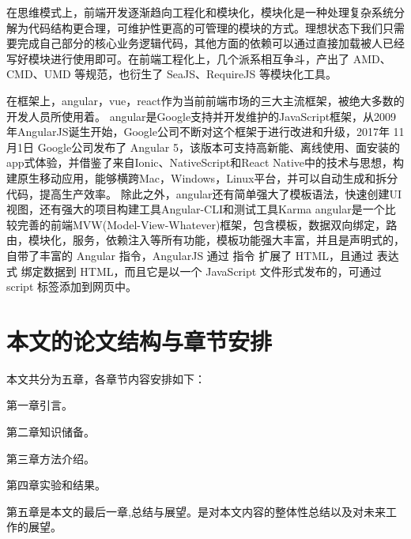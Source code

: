 在思维模式上，前端开发逐渐趋向工程化和模块化，模块化是一种处理复杂系统分解为代码结构更合理，可维护性更高的可管理的模块的方式。理想状态下我们只需要完成自己部分的核心业务逻辑代码，其他方面的依赖可以通过直接加载被人已经写好模块进行使用即可。在前端工程化上，几个派系相互争斗，产出了 AMD、CMD、UMD 等规范，也衍生了 SeaJS、RequireJS 等模块化工具。

在框架上，angular，vue，react作为当前前端市场的三大主流框架，被绝大多数的开发人员所使用着。
angular是Google支持并开发维护的JavaScript框架，从2009年AngularJS诞生开始，Google公司不断对这个框架于进行改进和升级，2017年 11月1日 Google公司发布了 Angular 5，该版本可支持高新能、离线使用、面安装的app式体验，并借鉴了来自Ionic、NativeScript和React Native中的技术与思想，构建原生移动应用，能够横跨Mac，Windows，Linux平台，并可以自动生成和拆分代码，提高生产效率。
除此之外，angular还有简单强大了模板语法，快速创建UI视图，还有强大的项目构建工具Angular-CLI和测试工具Karma
angular是一个比较完善的前端MVW(Model-View-Whatever)框架，包含模板，数据双向绑定，路由，模块化，服务，依赖注入等所有功能，模板功能强大丰富，并且是声明式的，自带了丰富的 Angular 指令，AngularJS 通过 指令 扩展了 HTML，且通过 表达式 绑定数据到 HTML，而且它是以一个 JavaScript 文件形式发布的，可通过 script 标签添加到网页中。

\section{本文的论文结构与章节安排}
\label{sec:arrangement}
本文共分为五章，各章节内容安排如下：

第一章引言。

第二章知识储备。

第三章方法介绍。

第四章实验和结果。

第五章是本文的最后一章,总结与展望。是对本文内容的整体性总结以及对未来工作的展望。

